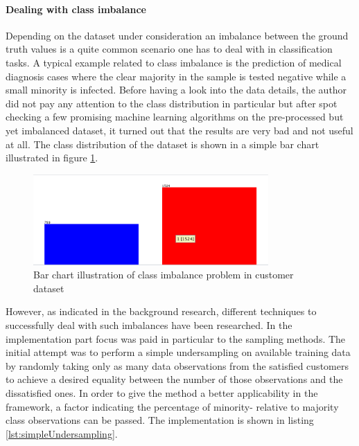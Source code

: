 \paragraph{Dealing with class imbalance}
Depending on the dataset under consideration an imbalance between the ground truth values is a quite common scenario one has to deal with in classification tasks. A typical example related to class imbalance is the prediction of medical diagnosis cases where the clear majority in the sample is tested negative while a small minority is infected. Before having a look into the data details, the author did not pay any attention to the class distribution in particular but after spot checking a few promising machine learning algorithms on the pre-processed but yet imbalanced dataset, it turned out that the results are very bad and not useful at all. The class distribution of the dataset is shown in a simple bar chart illustrated in figure \ref{fig:classDistribution}. 

\begin{figure}
	\centering
	\includegraphics[width=0.8\textwidth]{img/classImbalance.png}
	\caption{Bar chart illustration of class imbalance problem in customer dataset}
	\label{fig:classDistribution}
\end{figure} 

However, as indicated in the background research, different techniques to successfully deal with such imbalances have been researched. In the implementation part focus was paid in particular to the sampling methods. The initial attempt was to perform a simple undersampling on available training data by randomly taking only as many data observations from the satisfied customers to achieve a desired equality between the number of those observations and the dissatisfied ones. In order to give the method a better applicability in the framework, a factor indicating the percentage of minority- relative to majority class observations can be passed. The implementation is shown in listing \ref{lst:simpleUndersampling}. 

